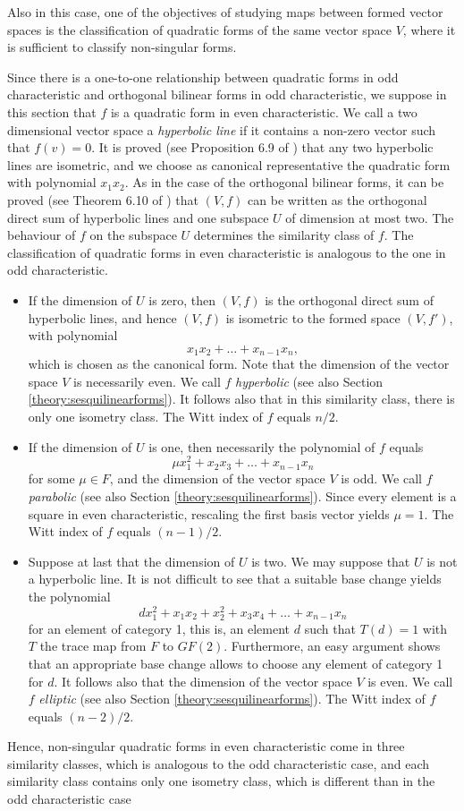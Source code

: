 \documentclass[a4paper,11pt]{report}
\begin{document}
{{ Also in this case, one of the objectives of studying maps between formed
vector spaces is the classification of quadratic forms of the same vector
space $V$, where it is sufficient to classify non-singular forms. 

Since there is a one-to-one relationship between quadratic forms in odd
characteristic and orthogonal bilinear forms in odd characteristic, we suppose
in this section that $f$ is a quadratic form in even characteristic. We call a two dimensional vector
space a \emph{hyperbolic line} if it contains a non-zero vector such that $f(v) = 0$. It is proved (see Proposition 6.9 of \cite{Cameron}) that any two hyperbolic lines are isometric, and we choose as canonical
representative the quadratic form with polynomial $ x_1 x_2$. As in the case of the orthogonal bilinear forms, it can be proved (see
Theorem 6.10 of \cite{Cameron}) that $(V,f)$ can be written as the orthogonal direct sum of hyperbolic lines and one
subspace $U$ of dimension at most two. The behaviour of $f$ on the subspace $U$ determines the similarity class of $f$. The classification of quadratic forms in even characteristic is analogous to
the one in odd characteristic. 
\begin{itemize}
\item If the dimension of $U$ is zero, then $(V,f)$ is the orthogonal direct sum of hyperbolic lines, and hence $(V,f)$ is isometric to the formed space $(V,f')$, with polynomial 
\[ x_1 x_2 + \ldots + x_{n-1}x_n, \]
  which is chosen as the canonical form. Note that the dimension of the vector
space $V$ is necessarily even. We call $f$ \emph{hyperbolic} (see also Section \ref{theory:sesquilinearforms}). It follows also that in this similarity class, there is only one isometry
class. The Witt index of $f$ equals $n/2$. 
\item If the dimension of $U$ is one, then necessarily the polynomial of $f$ equals 
\[ \mu x_1^2 + x_2 x_3 + \ldots + x_{n-1}x_n \]
  for some $\mu \in F$, and the dimension of the vector space $V$ is odd. We call $f$ \emph{parabolic} (see also Section \ref{theory:sesquilinearforms}). Since every element is a square in even characteristic, rescaling the first
basis vector yields $\mu=1$. The Witt index of $f$ equals $(n-1)/2$. 
\item  Suppose at last that the dimension of $U$ is two. We may suppose that $U$ is not a hyperbolic line. It is not difficult to see that a suitable base
change yields the polynomial 
\[ d x_1^2 + x_1x_2 + x_2^2 + x_3 x_4 + \ldots + x_{n-1}x_n \]
 for an element of category 1, this is, an element $d$ such that $T(d)=1$ with $T$ the trace map from $F$ to $GF(2)$. Furthermore, an easy argument shows that an appropriate base change allows
to choose any element of category 1 for $d$. It follows also that the dimension of the vector space $V$ is even. We call $f$ \emph{elliptic} (see also Section \ref{theory:sesquilinearforms}). The Witt index of $f$ equals $(n-2)/2$. 
\end{itemize}
 Hence, non-singular quadratic forms in even characteristic come in three
similarity classes, which is analogous to the odd characteristic case, and
each similarity class contains only one isometry class, which is different
than in the odd characteristic case 

}}
\end{document}
